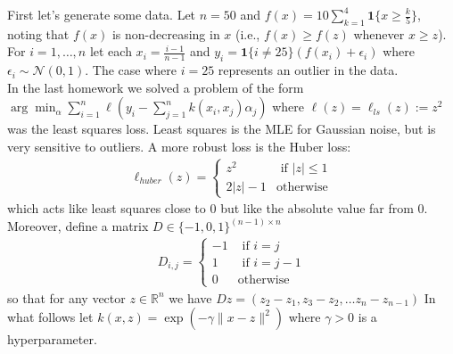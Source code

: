 \documentclass{article}
\newcommand{\field}[1]{\mathbb{#1}}
\newcommand{\1}{\mathbf{1}}
\newcommand{\R}{\field{R}} %
\begin{document}
First let's generate some data. 
Let $n=50$ and $f(x) = 10 \sum_{k=1}^4 \1\{x \geq \frac{k}{5}\}$, noting that $f(x)$ is non-decreasing in $x$ (i.e., $f(x) \geq f(z)$ whenever $x \geq z$). 
For $i=1,\dots,n$ let each $x_i=\frac{i-1}{n-1}$ and $y_i = \1\{i \neq 25\} (f(x_i) + \epsilon_i)$ where $\epsilon_i \sim \mathcal{N}(0,1)$.
The case where $i=25$ represents an outlier in the data.\\

In the last homework we solved a problem of the form $\arg\min_\alpha \sum_{i=1}^n \ell(y_i - \sum_{j=1}^n k(x_i, x_j) \alpha_j)$ where $\ell(z) = \ell_{ls}(z) := z^2$ was the least squares loss. 
Least squares is the MLE for Gaussian noise, but is very sensitive to outliers.
A more robust loss is the Huber loss:
\begin{align*}
\ell_{huber}(z) = \begin{cases} z^2 & \text{ if } |z| \leq 1 \\ 2|z| - 1 & \text{otherwise} \end{cases}
\end{align*}  
which acts like least squares close to $0$ but like the absolute value far from $0$.
Moreover, define a matrix $D \in \{-1,0,1\}^{(n-1) \times n}$
\begin{align*}
D_{i,j} = \begin{cases} -1 & \text{ if } i=j \\ 1 & \text{ if } i=j-1 \\ 0 & \text{otherwise} \end{cases}
\end{align*} 
so that for any vector $z \in \R^n$ we have $D z = ( z_2-z_1, z_3-z_2, \dots z_n - z_{n-1})$
In what follows let $k(x,z) = \exp(-\gamma \|x-z\|^2)$ where $\gamma > 0$ is a hyperparameter. 
\end{document}
